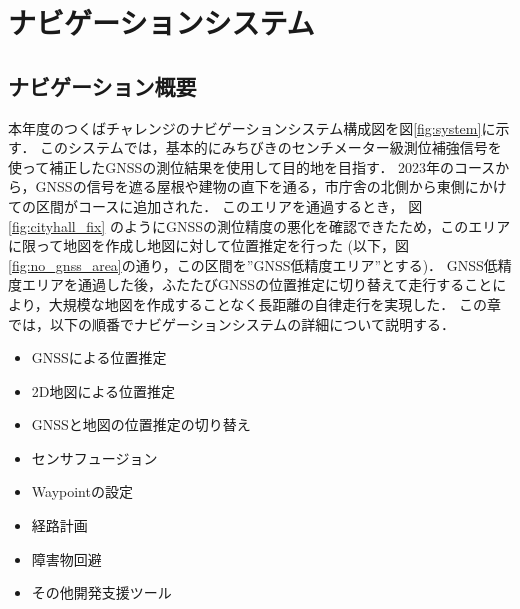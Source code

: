 \documentclass[platex,dvipdfmx]{rbproceedings}
\begin{document}
\section{ナビゲーションシステム}
\subsection{ナビゲーション概要}

本年度のつくばチャレンジのナビゲーションシステム構成図を図\ref{fig:system}に示す．
このシステムでは，基本的にみちびきのセンチメーター級測位補強信号を使って補正したGNSSの測位結果を使用して目的地を目指す．
2023年のコースから，GNSSの信号を遮る屋根や建物の直下を通る，市庁舎の北側から東側にかけての区間がコースに追加された．
このエリアを通過するとき， 図\ref{fig:cityhall_fix} のようにGNSSの測位精度の悪化を確認できたため，このエリアに限って地図を作成し地図に対して位置推定を行った
(以下，図\ref{fig:no_gnss_area}の通り，この区間を”GNSS低精度エリア”とする)．
GNSS低精度エリアを通過した後，ふたたびGNSSの位置推定に切り替えて走行することにより，大規模な地図を作成することなく長距離の自律走行を実現した．
この章では，以下の順番でナビゲーションシステムの詳細について説明する．

\begin{itemize}
    \item GNSSによる位置推定
    \item 2D地図による位置推定
    \item GNSSと地図の位置推定の切り替え
    \item センサフュージョン
    \item Waypointの設定
    \item 経路計画
    \item 障害物回避
    \item その他開発支援ツール
\end{itemize}
\end{document}
